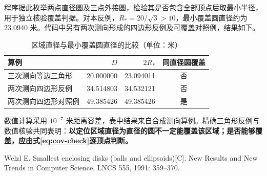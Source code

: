 程序据此枚举两点直径圆及三点外接圆，检验其是否包含全部顶点后取最小半径，用于独立核验覆盖判据。对本反例，$R_*=20/\sqrt3>10$，最小覆盖圆直径约为 $23.0940$ 米。代码中另有两次测向形成的四边形反例及可覆盖对照例，结果如下。
\begin{table}[H]
\centering
\caption{区域直径与最小覆盖圆直径的比较（单位：米）}
\begin{tabular}{lrrc}
\toprule
算例 & $D$ & $2R_*$ & 同直径圆覆盖\\
\midrule
三次测向等边三角形 & 20.000000 & 23.094011 & 否\\
两次测向四边形反例 & 34.514803 & 34.532121 & 否\\
两次测向四边形对照例 & 49.385426 & 49.385426 & 是\\
\bottomrule
\end{tabular}
\end{table}
数值计算采用 $10^{-7}$ 米距离容差，表中结果来自合成测向算例。精确三角形反例与数值核验共同表明：\textbf{以定位区域直径为直径的圆不一定能覆盖该区域；是否能够覆盖，应由式\eqref{eq:cov-check}逐顶点判断。}

\vspace{2pt}
{\footnotesize\noindent [1] Welzl E. Smallest enclosing disks (balls and ellipsoids)[C]. New Results and New Trends in Computer Science. LNCS 555, 1991: 359--370.}
